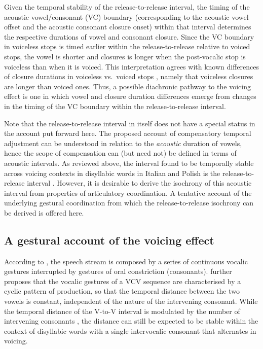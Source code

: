 \documentclass[12pt,a4paper,]{article}
\begin{document}
Given the temporal stability of the release-to-release interval, the
timing of the acoustic vowel/consonant (VC) boundary (corresponding to
the acoustic vowel offset and the acoustic consonant closure onset)
within that interval determines the respective durations of vowel and
consonant closure. Since the VC boundary in voiceless stops is timed
earlier within the release-to-release relative to voiced stops, the
vowel is shorter and closures is longer when the post-vocalic stop is
voiceless than when it is voiced. This interpretation agrees with known
differences of closure durations in voiceless vs.~voiced stops
\citep{lisker1957, van-summers1987, davis1989, de-jong1991}, namely that
voiceless closures are longer than voiced ones. Thus, a possible
diachronic pathway to the voicing effect is one in which vowel and
closure duration differences emerge from changes in the timing of the VC
boundary within the release-to-release interval.

Note that the release-to-release interval in itself does not have a
special status in the account put forward here. The proposed account of
compensatory temporal adjustment can be understood in relation to the
\textit{acoustic} duration of vowels, hence the scope of compensation
can (but need not) be defined in terms of acoustic intervals. As
reviewed above, the interval found to be temporally stable across
voicing contexts in disyllabic words in Italian and Polish is the
release-to-release interval \citep{coretta2019k}. However, it is
desirable to derive the isochrony of this acoustic interval from
properties of articulatory coordination. A tentative account of the
underlying gestural coordination from which the release-to-release
isochrony can be derived is offered here.

\hypertarget{a-gestural-account-of-the-voicing-effect}{%
\subsection{A gestural account of the voicing
effect}\label{a-gestural-account-of-the-voicing-effect}}

According to \citet{ohman1966, ohman1967}, the speech stream is composed
by a series of continuous vocalic gestures interrupted by gestures of
oral constriction (consonants). \citet{fowler1983} further proposes that
the vocalic gestures of a VCV sequence are characterised by a cyclic
pattern of production, so that the temporal distance between the two
vowels is constant, independent of the nature of the intervening
consonant. While the temporal distance of the V-to-V interval is
modulated by the number of intervening consonants
\citep{zmarich2011, zeroual2015}, the distance can still be expected to
be stable within the context of disyllabic words with a single
intervocalic consonant that alternates in voicing.
\end{document}
